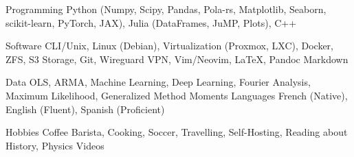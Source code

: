 

\begin{cvskills}

	\cvskill
	{Programming} %
	{Python (Numpy, Scipy, Pandas, Pola-rs, Matplotlib, Seaborn, scikit-learn, PyTorch, JAX), Julia (DataFrames, JuMP, Plots), C++} %

	\cvskill
	{Software}
	{CLI/Unix, Linux (Debian), Virtualization (Proxmox, LXC), Docker, ZFS, S3 Storage, Git, Wireguard VPN, Vim/Neovim, \LaTeX, Pandoc Markdown}

	\cvskill
	{Data}
	{OLS, ARMA, Machine Learning, Deep Learning, Fourier Analysis, Maximum Likelihood, Generalized Method Moments}
	\cvskill
	{Languages} %
	{French (Native), English (Fluent), Spanish (Proficient)} %

	\cvskill
	{Hobbies}
	{Coffee Barista, Cooking, Soccer, Travelling, Self-Hosting, Reading about History, Physics Videos}
\end{cvskills}
